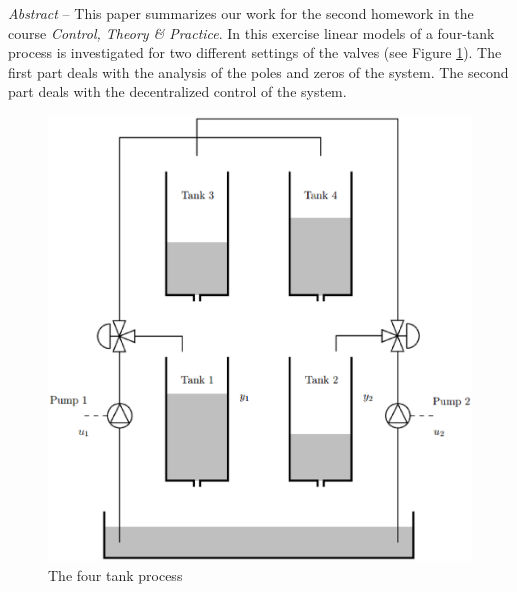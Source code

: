 \begin{bfseries}
\emph{Abstract} -- 
This paper summarizes our work for the second homework in the course \emph{Control, Theory \& Practice}. 
In this exercise linear models of a four-tank process is investigated for two different settings of the valves (see Figure \ref{tank}).
The first part deals with the analysis of the poles and zeros of the system.
The second part deals with the decentralized control of the system.
\end{bfseries}

\begin{center}
\begin{figure}[h!b]
    \centering
    \includegraphics[width=\columnwidth]{fig/tank.eps}
    \caption{The four tank process}
    \label{tank}
\end{figure}
\end{center}
